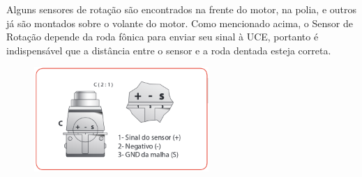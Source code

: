 \begin{enumerate}
  Alguns sensores de rotação são encontrados na frente do motor, na polia, e outros já são montados sobre o volante do motor. Como mencionado acima, o Sensor de Rotação depende da roda fônica para enviar seu sinal à UCE, portanto é indispensável que a distância entre o sensor e a roda dentada esteja correta.

  \begin{figure}[h]
    \centering
    \includegraphics[width=250px, scale=0.5]{figuras/sensor}
    \label{table:patente2}
  \end{figure}
\end{enumerate}
